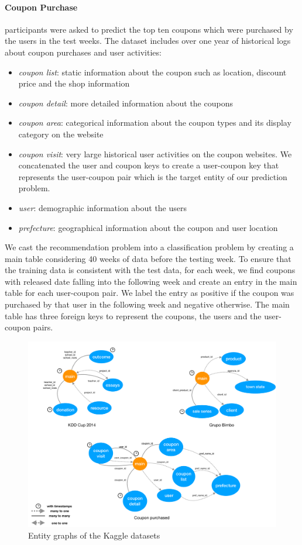 \paragraph{Coupon Purchase} participants were asked to predict the top ten coupons which were purchased by the users in the test weeks. The dataset includes over one year of historical logs about coupon purchases and user activities: 
\begin{itemize}
\item \textit{coupon list}: static information about the coupon such as location, discount price and the shop information
\item \textit{coupon detail}: more detailed information about the coupons
\item \textit{coupon area}: categorical information about the coupon types and its display category on the website
\item \textit{coupon visit}: very large historical user activities on the coupon websites. We concatenated the user and coupon keys to create a user-coupon key that represents the user-coupon pair which is the target entity of our prediction problem.
\item \textit{user}: demographic information about the users
\item \textit{prefecture}: geographical information about the coupon and user location
\end{itemize} 
We cast the recommendation problem into a classification problem by creating a main table considering 40 weeks of data before the testing week. To ensure that the training data is consistent with the test data, for each week, we find coupons with released date falling into the following week and create an entry in the main table for each user-coupon pair. We label the entry as positive if the coupon was purchased by that user in the following week and negative otherwise. The main table has three foreign keys to represent the coupons, the users and the user-coupon pairs. 

\begin{figure}[tb]
    \centering
    \includegraphics[width=1.0\textwidth]{./egraph.pdf}
    \caption{Entity graphs of the Kaggle datasets}
    \label{fig:kaggle database}
\end{figure} 

